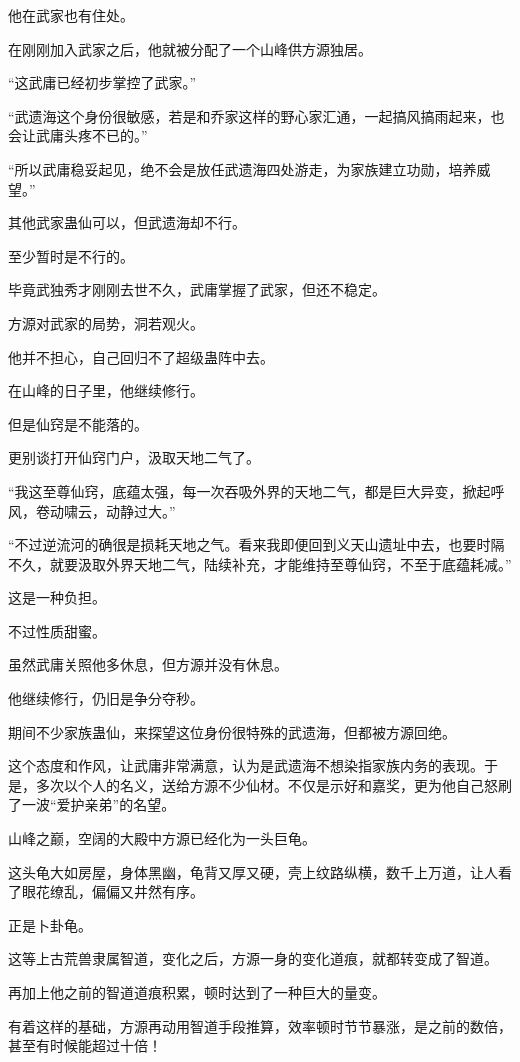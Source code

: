 \begin{this_body}
他在武家也有住处。

在刚刚加入武家之后，他就被分配了一个山峰供方源独居。

“这武庸已经初步掌控了武家。”

“武遗海这个身份很敏感，若是和乔家这样的野心家汇通，一起搞风搞雨起来，也会让武庸头疼不已的。”

“所以武庸稳妥起见，绝不会是放任武遗海四处游走，为家族建立功勋，培养威望。”

其他武家蛊仙可以，但武遗海却不行。

至少暂时是不行的。

毕竟武独秀才刚刚去世不久，武庸掌握了武家，但还不稳定。

方源对武家的局势，洞若观火。

他并不担心，自己回归不了超级蛊阵中去。

在山峰的日子里，他继续修行。

但是仙窍是不能落的。

更别谈打开仙窍门户，汲取天地二气了。

“我这至尊仙窍，底蕴太强，每一次吞吸外界的天地二气，都是巨大异变，掀起呼风，卷动啸云，动静过大。”

“不过逆流河的确很是损耗天地之气。看来我即便回到义天山遗址中去，也要时隔不久，就要汲取外界天地二气，陆续补充，才能维持至尊仙窍，不至于底蕴耗减。”

这是一种负担。

不过性质甜蜜。

虽然武庸关照他多休息，但方源并没有休息。

他继续修行，仍旧是争分夺秒。

期间不少家族蛊仙，来探望这位身份很特殊的武遗海，但都被方源回绝。

这个态度和作风，让武庸非常满意，认为是武遗海不想染指家族内务的表现。于是，多次以个人的名义，送给方源不少仙材。不仅是示好和嘉奖，更为他自己怒刷了一波“爱护亲弟”的名望。

山峰之巅，空阔的大殿中方源已经化为一头巨龟。

这头龟大如房屋，身体黑幽，龟背又厚又硬，壳上纹路纵横，数千上万道，让人看了眼花缭乱，偏偏又井然有序。

正是卜卦龟。

这等上古荒兽隶属智道，变化之后，方源一身的变化道痕，就都转变成了智道。

再加上他之前的智道道痕积累，顿时达到了一种巨大的量变。

有着这样的基础，方源再动用智道手段推算，效率顿时节节暴涨，是之前的数倍，甚至有时候能超过十倍！


\end{this_body}

